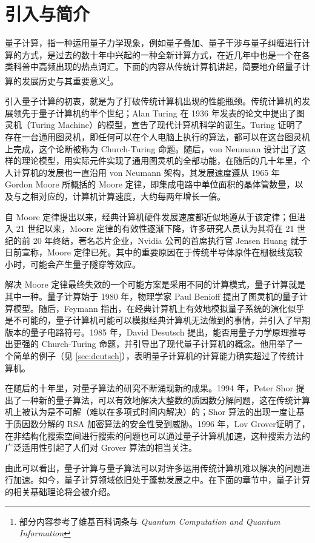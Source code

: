 \section{引入与简介}

量子计算，指一种运用量子力学现象，例如量子叠加、量子干涉与量子纠缠进行计算的方式，是过去的数十年中兴起的一种全新计算方式，在近几年中也是一个在各类科普中高频出现的热点词汇。下面的内容从传统计算机讲起，简要地介绍量子计算的发展历史与其重要意义\footnote{部分内容参考了维基百科词条与 \textit{Quantum Computation and Quantum Information}\cite{nielsen2002quantum}}。

引入量子计算的初衷，就是为了打破传统计算机出现的性能瓶颈。传统计算机的发展领先于量子计算机约半个世纪；Alan Turing 在 1936 年发表的论文中提出了图灵机（Turing Machine）的模型\cite{turing1936computable}，宣告了现代计算机科学的诞生。Turing 证明了存在一台通用图灵机，即任何可以在个人电脑上执行的算法，都可以在这台图灵机上完成，这个论断被称为 Church-Turing 命题。随后，von Neumann 设计出了这样的理论模型，用实际元件实现了通用图灵机的全部功能，在随后的几十年里，个人计算机的发展也一直沿用 von Neumann 架构，其发展速度遵从 1965 年 Gordon Moore 所概括的 Moore 定律，即集成电路中单位面积的晶体管数量，以及与之相对应的，计算机计算速度，大约每两年增长一倍\cite{moore1965cramming}。

自 Moore 定律提出以来，经典计算机硬件发展速度都近似地遵从于该定律；但进入 21 世纪以来，Moore 定律的有效性逐渐下降，许多研究人员认为其将在 21 世纪的前 20 年终结，著名芯片企业，Nvidia 公司的首席执行官 Jensen Huang 就于日前宣称，Moore 定律已死\cite{moorelawdead}。其中的重要原因在于传统半导体原件在栅极线宽较小时，可能会产生量子隧穿等效应\cite{kumar2015fundamental}。

解决 Moore 定律最终失效的一个可能方案是采用不同的计算模式，量子计算就是其中一种。量子计算始于 1980 年，物理学家 Paul Benioff 提出了图灵机的量子计算模型\cite{benioff1980computer}。随后，Feymann 指出，在经典计算机上有效地模拟量子系统的演化似乎是不可能的，量子计算机可能可以模拟经典计算机无法做到的事情\cite{feynman1981simulating}，并引入了早期版本的量子电路符号\cite{feynman1986quantum}。1985 年，David Desutsch 提出，能否用量子力学原理推导出更强的 Church-Turing 命题，并引导出了现代量子计算机的概念\cite{deutsch1985quantum}。他用举了一个简单的例子（见 \ref{sec:deutsch}），表明量子计算机的计算能力确实超过了传统计算机。

在随后的十年里，对量子算法的研究不断涌现新的成果。1994 年，Peter Shor 提出了一种新的量子算法，可以有效地解决大整数的质因数分解问题\cite{shor1994algorithms}，这在传统计算机上被认为是不可解（难以在多项式时间内解决）的；Shor 算法的出现一度让基于质因数分解的 RSA 加密算法的安全性受到威胁\cite{mermin2006breaking}。1996 年，Lov Grover证明了，在非结构化搜索空间进行搜索的问题也可以通过量子计算机加速\cite{grover1996fast}，这种搜索方法的广泛适用性引起了人们对 Grover 算法的相当关注。

由此可以看出，量子计算与量子算法可以对许多运用传统计算机难以解决的问题进行加速。如今，量子计算领域依旧处于蓬勃发展之中。在下面的章节中，量子计算的相关基础理论将会被介绍。